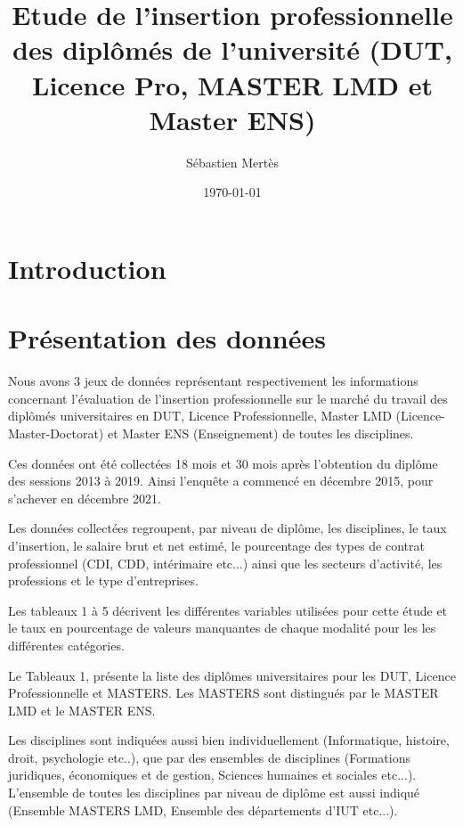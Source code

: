 \documentclass[12pt, a4paper, titlepage, table]{article}
\begin{document}
	\label{document}
	\title{Etude de l'insertion professionnelle des diplômés de l'université (DUT, Licence Pro, MASTER LMD et Master ENS)}
	\author{Sébastien Mertès}
	\date{\today}
	\maketitle
	\renewcommand{\thesection}{\arabic{section}.}
	\renewcommand{\thesubsection}{\thesection\arabic{subsection}}
	\renewcommand{\tablename}{Tableau}
	\renewcommand{\abstractname}{Résumé}
	\setlength{\parindent}{0pt}
	\captionsetup{labelfont=bf, font=small}
	\tableofcontents
	\newpage
	
\section{Introduction}
	
\section{Présentation des données}
	Nous avons 3 jeux de données représentant respectivement les informations concernant l'évaluation de l'insertion professionnelle sur le marché du travail des diplômés universitaires en DUT, Licence Professionnelle, Master LMD (Licence-Master-Doctorat) et Master ENS (Enseignement) de toutes les disciplines. 
	
	Ces données ont été collectées 18 mois et 30 mois après l'obtention du diplôme des sessions  2013 à 2019. Ainsi l'enquête a commencé en décembre 2015, pour s'achever en décembre 2021.
	
	Les données collectées regroupent, par niveau de diplôme, les disciplines, le taux d'insertion, le salaire brut et net estimé, le pourcentage des types de contrat professionnel (CDI, CDD, intérimaire etc...) ainsi que les secteurs d'activité, les professions et le type d'entreprises.
	
	Les tableaux 1 à 5 décrivent les différentes variables utilisées pour cette étude et le taux en pourcentage de valeurs manquantes de chaque modalité pour les les différentes catégories.
	
	Le Tableaux 1, présente la liste des diplômes universitaires pour les DUT, Licence Professionnelle et MASTERS.
	Les MASTERS sont distingués par le MASTER LMD et le MASTER ENS. 
	
	Les disciplines sont indiquées aussi bien individuellement (Informatique, histoire, droit, psychologie etc..), que par des ensembles de disciplines (Formations juridiques, économiques et de gestion, Sciences humaines et sociales etc...). L'ensemble de toutes les disciplines par niveau de diplôme est aussi indiqué (Ensemble MASTERS LMD, Ensemble des départements d'IUT etc...).   
	
\end{document}
